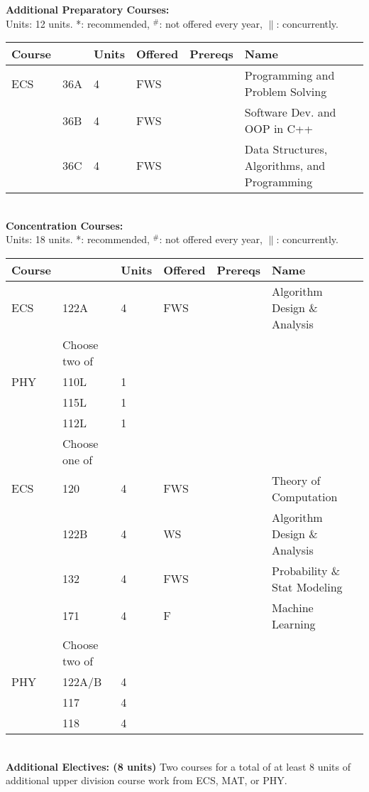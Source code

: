 \documentclass[12pt]{article}
\begin{document}
\newpage
{}
\vskip 0.25cm
\noindent
{\bf Additional Preparatory Courses:  }\\
Units:  12 units. *: recommended, $^\#$: not offered every year, $\parallel$: concurrently.\\
\begin{tabular}{|llllll|}
\hline
Course & & Units & Offered & Prereqs & Name \\
\hline
ECS & 36A  & 4 & FWS & & Programming and Problem Solving\\
    & 36B  & 4 & FWS & & Software Dev. and OOP in C++\\
    & 36C  & 4 & FWS & & Data Structures, Algorithms, and Programming\\
\hline
\end{tabular}\\
\vskip 0.25cm
\noindent
{\bf Concentration Courses:  }\\
Units:  18 units. *: recommended, $^\#$: not offered every year, $\parallel$: concurrently.\\
\begin{tabular}{|llllll|}
\hline
Course & & Units & Offered & Prereqs & Name \\
\hline
ECS & 122A & 4 & FWS & & Algorithm Design \& Analysis\\
\hline
\hline
    & Choose two of & & & & \\
\hline
PHY    & 110L & 1 & & & \\
    & 115L & 1 & & & \\
    & 112L & 1 & & & \\
\hline
\hline
    & Choose one of & & & & \\
\hline
ECS & 120  & 4 & FWS & & Theory of Computation \\
    & 122B & 4 & WS  & & Algorithm Design \& Analysis \\
    & 132  & 4 & FWS & & Probability \& Stat Modeling \\
    & 171  & 4 & F   & & Machine Learning \\
\hline
\hline
    & Choose two of & & & & \\
\hline
PHY & 122A/B & 4 & & & \\
    & 117   & 4 & & & \\
    & 118   & 4 & & & \\
\hline
\end{tabular}\\
\vskip 0.25cm
\noindent
{\bf Additional Electives: (8 units)} Two courses for a total of at least 8 units of additional upper division course work from ECS, MAT, or PHY.\\
\end{document}

